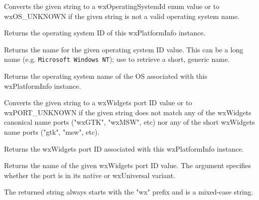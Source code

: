 
Converts the given string to a wxOperatingSystemId enum value or to
wxOS\_UNKNOWN if the given string is not a valid operating system name.


Returns the operating system ID of this wxPlatformInfo instance.



\label{wxplatforminfogetoperatingsystemidname}


Returns the name for the given operating system ID value. This can be a long name
(e.g. {\tt Microsoft Windows NT}); use  to
retrieve a short, generic name.



Returns the operating system name of the OS associated with this wxPlatformInfo instance.





\label{wxplatforminfogetportid}


Converts the given string to a wxWidgets port ID value or to wxPORT\_UNKNOWN if
the given string does not match any of the wxWidgets canonical name ports ("wxGTK", "wxMSW", etc)
nor any of the short wxWidgets name ports ("gtk", "msw", etc).


Returns the wxWidgets port ID associated with this wxPlatformInfo instance.

\label{wxplatforminfogetportidname}


Returns the name of the given wxWidgets port ID value. The 
argument specifies whether the port is in its native or wxUniversal variant.

The returned string always starts with the "wx" prefix and is a mixed-case
string.

